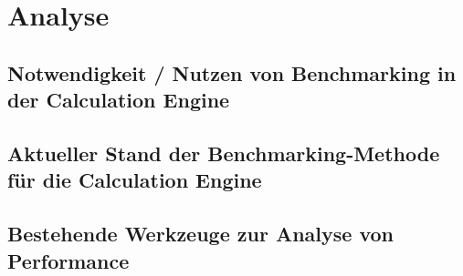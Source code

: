 \chapter{Analyse}
\section{Notwendigkeit / Nutzen von Benchmarking in der Calculation Engine}
\section{Aktueller Stand der Benchmarking-Methode für die Calculation Engine}
\section{Bestehende Werkzeuge zur Analyse von Performance}
